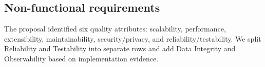 \documentclass[11pt]{article}
\begin{document}

\subsection{Non-functional requirements}

The proposal identified six quality attributes: scalability, performance, extensibility,
maintainability, security/privacy, and reliability/testability.
We split Reliability and Testability into separate rows and add Data Integrity and
Observability based on implementation evidence.
\end{document}
